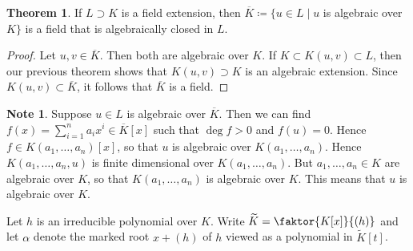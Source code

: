 \documentclass[10pt,letterpaper,cm]{nupset}
\theoremstyle{definition}
\newtheorem{note}{Note}
\newtheorem{theorem}{Theorem}
\newcommand{\1}{\mathbf{1}}
\newcommand{\0}{\vec 0}
\begin{document}
\begin{theorem}
If $L \supset K$ is a field extension, then $\overline{K}\coloneqq  \{u\in L \mid u$ is algebraic over $K\}$ is a field that is algebraically closed in $L$.
\end{theorem}
\begin{proof}
Let $u,v \in \overline{K}$. Then both are algebraic over $K$. If $K \subset K(u,v) \subset L$, then our previous theorem shows that $K(u,v) \supset K$ is an algebraic extension. Since $K(u,v) \subset \overline{K}$, it follows that $\overline{K}$ is a field. 
\end{proof}

\begin{note}
Suppose $u\in L$ is algebraic over $\overline{K}$. Then we can find $f(x) = \sum_{i=1}^n a_ix^i \in \overline{K}[x]$ such that $\deg{f} >0$ and $f(u) =0$. Hence $f\in K(a_1, \ldots, a_n)[x]$, so that $u$ is algebraic over $K(a_1, \ldots, a_n)$. Hence $K(a_1, \ldots, a_n, u)$ is finite dimensional over $K(a_1, \ldots, a_n)$. But $a_1, \ldots, a_n \in K$ are algebraic over $K$, so that $K(a_1, \ldots, a_n)$ is algebraic over $K$.  This means that $u$ is algebraic over $K$.

Let $h$ is an irreducible polynomial over $K$. Write $\widetilde{K} = \faktor{K[x]}{(h)}$ and let $\alpha$ denote the marked root $x+(h)$ of $h$ viewed as a polynomial in $\widetilde{K}[t]$.
\end{note}
\end{document}

